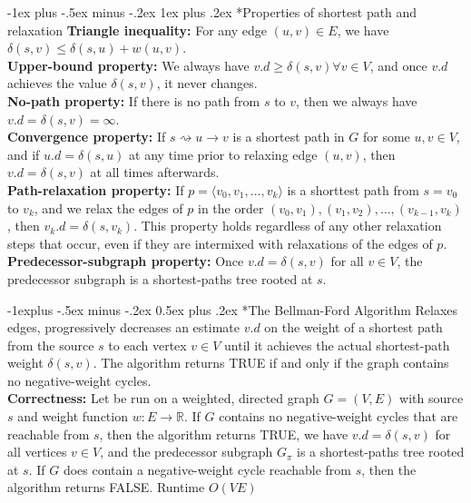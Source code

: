 \documentclass[10pt,landscape]{article}
\makeatletter
\renewcommand{\subsection}{\@startsection{subsection}{2}{0mm}%
                                {-1explus -.5ex minus -.2ex}%
                                {0.5ex plus .2ex}%
                                {\normalfont\normalsize\bfseries}}
\renewcommand{\subsubsection}{\@startsection{subsubsection}{3}{0mm}%
                                {-1ex plus -.5ex minus -.2ex}%
                                {1ex plus .2ex}%
                                {\normalfont\small\bfseries}}
\makeatother
\begin{document}
\begin{multicols}{3}
\subsubsection*{Properties of shortest path and relaxation}
\scriptsize {
\textbf{Triangle inequality:} For any edge $(u,v) \in E$, we have $\delta(s,v) \leq \delta(s, u) + w(u,v)$.\\
\textbf{Upper-bound property:} We always have $v.d \geq \delta(s,v) \forall v \in V$, and once $v.d$ achieves the value $\delta(s,v)$, it never changes.\\
\textbf{No-path property:} If there is no path from $s$ to $v$, then we always have $v.d = \delta(s,v) = \infty$.\\
\textbf{Convergence property:} If $s \rightsquigarrow u \rightarrow v$ is a shortest path in $G$ for some $u, v \in V$, and if $u.d = \delta(s,u)$ at any time prior to relaxing edge $(u, v)$, then $v.d = \delta(s, v)$ at all times afterwards.\\
\textbf{Path-relaxation property:} If $p = \langle v_0, v_1,\ldots,v_k\rangle$ is a shorttest path from $s = v_0$ to $v_k$, and we relax the edges of $p$ in the order $(v_0, v_1), (v_1, v_2),\ldots,(v_{k-1},v_{k})$, then $v_{k}.d = \delta(s,v_k)$. This property holds regardless of any other relaxation steps that occur, even if they are intermixed with relaxations of the edges of $p$.\\
\textbf{Predecessor-subgraph property:} Once $v.d=\delta(s, v)$ for all $v \in V$, the predecessor subgraph is a shortest-paths tree rooted at $s$.
}

\subsection*{The Bellman-Ford Algorithm}
\scriptsize {
Relaxes edges, progressively decreases an estimate $v.d$ on the weight of a shortest path from the source $s$ to each vertex $v \in V$ until it achieves the actual shortest-path weight $\delta(s,v)$. The algorithm returns TRUE if and only if the graph contains no negative-weight cycles.\\
\textbf{Correctness:} Let  be run on a weighted, directed graph $G = (V,E)$ with source $s$ and weight function $w: E \rightarrow \mathbb{R}$. If $G$ contains no negative-weight cycles that are reachable from $s$, then the algorithm returns TRUE, we have $v.d = \delta(s,v)$ for all vertices $v \in V$, and the predecessor subgraph $G_\pi$ is a shortest-paths tree rooted at $s$. If $G$ does contain a negative-weight cycle reachable from $s$, then the algorithm returns FALSE. Runtime $O(VE)$
}


\end{multicols}
\end{document}
